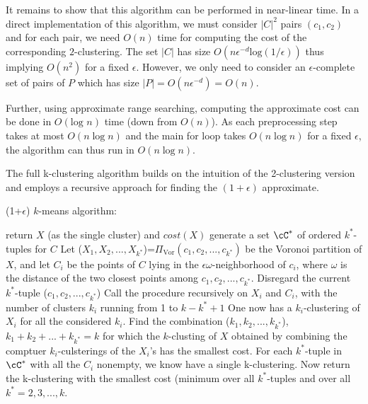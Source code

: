 
It remains to show that this algorithm can be performed in near-linear time. In a direct implementation of this algorithm, we must consider $|C|^2$ pairs $(c_1,c_2)$ and for each pair, we need $O(n)$ time for computing the cost of the corresponding $2$-clustering. The set $|C|$ has size $O(n \epsilon^{-d} \text{log}(1/\epsilon))$ thus implying $O(n^2)$ for a fixed $\epsilon$. However, we only need to consider an $\epsilon$-complete set of pairs of $P$ which has size $|P|=O(n \epsilon^{-d})=O(n)$.

Further, using approximate range searching, computing the approximate cost can be done in $O(\text{log }n)$ time (down from $O(n)$). As each preprocessing step takes at most $O(n \log n)$ and the main for loop takes $O(n \log n)$ for a fixed $\epsilon$, the algorithm can thus run in $O(n \log n)$.

The full k-clustering algorithm builds on the intuition of the 2-clustering version and employs a recursive approach for finding the $(1+\epsilon)$ approximate.

\begin{algorithm}[H]
  \caption{(1+$\epsilon$) $k$-means algorithm:}
\begin{algorithmic} 
  \STATE return $X$ (as the single cluster) and $cost(X)$
\ENDIF
{}
  \STATE generate a set $\cC^*$ of ordered $k^*$-tuples for $C$
    \STATE Let ($X_1,X_2,...,X_{k^*}$)=$\Pi_{\text{Vor}}(c_1,c_2,...,c_{k^*})$ be
    the Voronoi partition of $X$, and let $C_i$ be the points of $C$ lying in the
    $\epsilon \omega$-neighborhood of $c_i$, where $\omega$ is the distance of
    the two closest points among $c_1,c_2,...,c_{k^*}$.
      \STATE Disregard the current $k^*$-tuple
      ($c_1,c_2,...,c_{k^*}$)
    \ELSE
        \STATE Call the procedure recursively on $X_i$ and $C_i$, with
        the number of clusters $k_i$ running from 1 to $k-k^*+1$
      \ENDFOR
      \STATE One now has a $k_i$-clustering of $X_i$ for all the
      considered $k_i$.
      \STATE Find the combination
      ($k_1,k_2,...,k_{k^*}$),$k_1+k_2+...+k_{k^*}=k$ for which the
      $k$-clusting of $X$ obtained by combining the comptuer
      $k_i$-culsterings of the $X_i$'s has the smallest cost.
    \ENDIF
  \ENDFOR
\ENDFOR
\STATE For each $k^*$-tuple in $\cC^*$ with all the $C_i$ nonempty,
we know have a single k-clustering. Now return the k-clustering with
the smallest cost (minimum over all $k^*$-tuples and over all $k^*=2,3,...,k$.
\end{algorithmic}
\end{algorithm}

